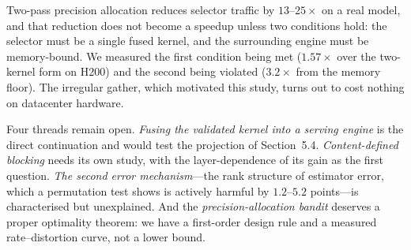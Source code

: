 \documentclass[sigconf,nonacm,11pt]{acmart}
\begin{document}
Two-pass precision allocation reduces selector traffic by $13$--$25\times$ on a
real model, and that reduction does not become a speedup unless two conditions
hold: the selector must be a single fused kernel, and the surrounding engine must
be memory-bound. We measured the first condition being met ($1.57\times$ over the
two-kernel form on H200) and the second being violated ($3.2\times$ from the
memory floor). The irregular gather, which motivated this study, turns out to
cost nothing on datacenter hardware.

Four threads remain open. \emph{Fusing the validated kernel into a serving
engine} is the direct continuation and would test the projection of
Section~5.4. \emph{Content-defined blocking} needs its own study, with the
layer-dependence of its gain as the first question. \emph{The second error
mechanism}---the rank structure of estimator error, which a permutation test
shows is actively harmful by $1.2$--$5.2$ points---is characterised but
unexplained. And the \emph{precision-allocation bandit} deserves a proper
optimality theorem: we have a first-order design rule and a measured
rate--distortion curve, not a lower bound.



\end{document}
